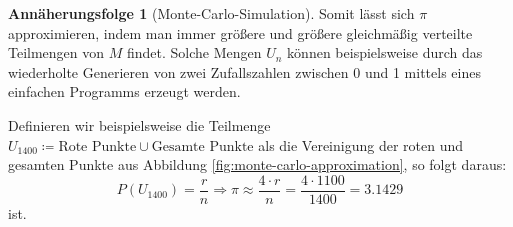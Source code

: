 \documentclass{scrartcl}
\theoremstyle{definition}
\newtheorem{approximation sequence}{Annäherungsfolge}
\begin{document}
\begin{approximation sequence}[Monte-Carlo-Simulation]
Somit lässt sich \(\pi\) approximieren, indem man immer größere und größere
gleichmäßig verteilte Teilmengen von \(M\) findet. Solche Mengen \(U_n\) können
beispielsweise durch das wiederholte Generieren von zwei Zufallszahlen zwischen
0 und 1 mittels eines einfachen Programms erzeugt werden.

Definieren wir beispielsweise die Teilmenge \(U_{1400} \coloneq \text{Rote
Punkte} \cup \text{Gesamte Punkte}\) als die Vereinigung der roten und gesamten
Punkte aus Abbildung \autoref{fig:monte-carlo-approximation}, so folgt daraus:
\begin{equation}
    P(U_{1400})
    = \frac{r}{n} \Rightarrow \pi \approx \frac{4 \cdot r}{n}
    = \frac{4 \cdot 1100}{1400} = 3.1429
\end{equation}
ist.

\end{approximation sequence}
\end{document}

